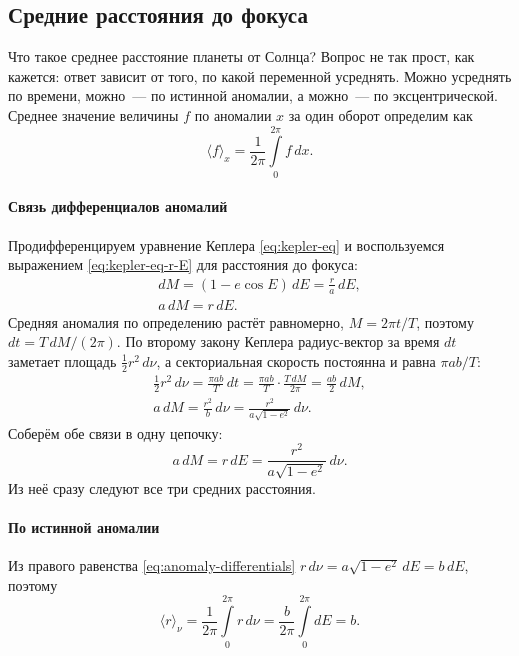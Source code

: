 \subsection{Средние расстояния до фокуса}
\label{sec:mean-distance}
Что такое среднее расстояние планеты от Солнца? Вопрос не так прост, как кажется: ответ зависит от того, по какой переменной усреднять. Можно усреднять по времени, можно~--- по истинной аномалии, а можно~--- по эксцентрической. Среднее значение величины $f$ по аномалии $x$ за один оборот определим как
\begin{equation*}
    \langle f \rangle_x = \frac{1}{2\pi}\int\limits_0^{2\pi} f\,dx.
\end{equation*}

\paragraph{Связь дифференциалов аномалий} Продифференцируем уравнение Кеплера \eqref{eq:kepler-eq} и воспользуемся выражением \eqref{eq:kepler-eq-r-E} для расстояния до фокуса:
\begin{gather*}
    dM = (1 - e\cos E)\,dE = \frac{r}{a}\,dE,\\
    a\,dM = r\,dE.
\end{gather*}
Средняя аномалия по определению растёт равномерно, $M = 2\pi t / T$, поэтому $dt = T\,dM / (2\pi)$. По второму закону Кеплера радиус-вектор за время $dt$ заметает площадь $\frac{1}{2} r^2\,d\nu$, а секториальная скорость постоянна и равна $\pi a b / T$:
\begin{gather*}
    \frac{1}{2} r^2\,d\nu = \frac{\pi a b}{T}\,dt = \frac{\pi a b}{T} \cdot \frac{T\,dM}{2\pi} = \frac{ab}{2}\,dM,\\
    a\,dM = \frac{r^2}{b}\,d\nu = \frac{r^2}{a\sqrt{1 - e^2}}\,d\nu.
\end{gather*}
Соберём обе связи в одну цепочку:
\begin{equation}
    a\,dM = r\,dE = \frac{r^2}{a\sqrt{1 - e^2}}\,d\nu.
    \label{eq:anomaly-differentials}
\end{equation}
Из неё сразу следуют все три средних расстояния.

\paragraph{По истинной аномалии} Из правого равенства \eqref{eq:anomaly-differentials} $r\,d\nu = a\sqrt{1 - e^2}\,dE = b\,dE$, поэтому
\begin{equation*}
    \langle r \rangle_\nu
    = \frac{1}{2\pi}\int\limits_0^{2\pi} r\,d\nu
    = \frac{b}{2\pi}\int\limits_0^{2\pi} dE
    = b.
\end{equation*}

